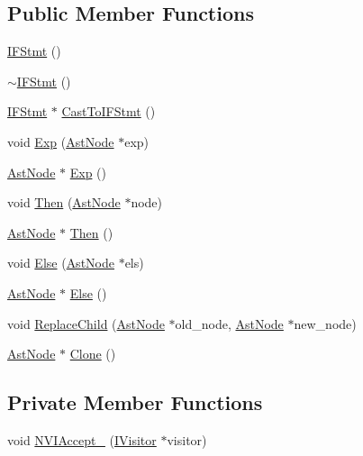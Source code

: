 \subsection*{Public Member Functions}
\begin{DoxyCompactItemize}
\item 
\hyperlink{classmocha_1_1_i_f_stmt_ae40c49bf6f6ce24f261dfe1793659b89}{IFStmt} ()
\item 
\hyperlink{classmocha_1_1_i_f_stmt_ac98aa3d1b29ddbc7043053883345e83f}{$\sim$IFStmt} ()
\item 
\hyperlink{classmocha_1_1_i_f_stmt}{IFStmt} $\ast$ \hyperlink{classmocha_1_1_i_f_stmt_a5d9f034d4ad5a7763cfbb0a952fe1cfe}{CastToIFStmt} ()
\item 
void \hyperlink{classmocha_1_1_i_f_stmt_a67ca46e8924d67558cfed953109d0b14}{Exp} (\hyperlink{classmocha_1_1_ast_node}{AstNode} $\ast$exp)
\item 
\hyperlink{classmocha_1_1_ast_node}{AstNode} $\ast$ \hyperlink{classmocha_1_1_i_f_stmt_ae6cfe9247696ac9d20a118076e9e8384}{Exp} ()
\item 
void \hyperlink{classmocha_1_1_i_f_stmt_a90315bb9f0ca0e94f5cd7dc991198b94}{Then} (\hyperlink{classmocha_1_1_ast_node}{AstNode} $\ast$node)
\item 
\hyperlink{classmocha_1_1_ast_node}{AstNode} $\ast$ \hyperlink{classmocha_1_1_i_f_stmt_a535c45c2baed98257ca19a993e2abf03}{Then} ()
\item 
void \hyperlink{classmocha_1_1_i_f_stmt_aacfb40095d0aa2ed27424493129e5df0}{Else} (\hyperlink{classmocha_1_1_ast_node}{AstNode} $\ast$els)
\item 
\hyperlink{classmocha_1_1_ast_node}{AstNode} $\ast$ \hyperlink{classmocha_1_1_i_f_stmt_a871f4f5a9a4af2dd6451809a1d93a04b}{Else} ()
\item 
void \hyperlink{classmocha_1_1_i_f_stmt_aaa7680ea1342a889c89c9032e998f55d}{ReplaceChild} (\hyperlink{classmocha_1_1_ast_node}{AstNode} $\ast$old\_\-node, \hyperlink{classmocha_1_1_ast_node}{AstNode} $\ast$new\_\-node)
\item 
\hyperlink{classmocha_1_1_ast_node}{AstNode} $\ast$ \hyperlink{classmocha_1_1_i_f_stmt_aefc355a93530af95107dfca9f25b1e70}{Clone} ()
\end{DoxyCompactItemize}
\subsection*{Private Member Functions}
\begin{DoxyCompactItemize}
\item 
void \hyperlink{classmocha_1_1_i_f_stmt_ae8dc0f336ec79750d3e713d0e8a0b1fe}{NVIAccept\_\-} (\hyperlink{classmocha_1_1_i_visitor}{IVisitor} $\ast$visitor)
\end{DoxyCompactItemize}
